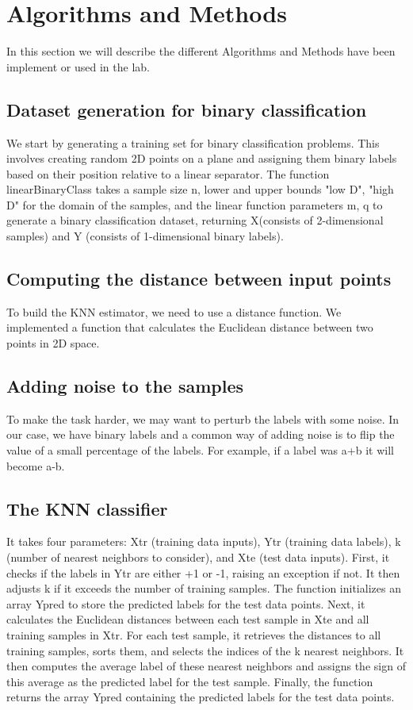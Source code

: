\documentclass[a4paper,10pt,oneside]{article}
\begin{document}
\section{ Algorithms and Methods }
\label{sec:format}
In this section we will describe the different Algorithms and Methods have been 
implement or used in the lab.

\subsection{ Dataset generation for binary classification }
\label{ssec:subhead}
We start by generating a training set for binary classification problems. 
This involves creating random 2D points on a plane and assigning them binary 
labels based on their position relative to a linear separator.
The function linearBinaryClass takes a sample size n, lower and upper bounds 
"low D", "high D" for the domain of the samples, and the linear function 
parameters m, q to generate a binary classification dataset, 
returning X(consists of 2-dimensional samples) and Y
(consists of 1-dimensional binary labels).

\subsection{ Computing the distance between input points }
\label{ssec:subhead}
To build the KNN estimator, we need to use a distance function. 
We implemented a function that calculates the Euclidean distance
between two points in 2D space.

\subsection{ Adding noise to the samples }
\label{ssec:subhead}
To make the task harder, we may want to perturb the labels with some noise.
In our case, we have binary labels and a common way of adding noise is to 
flip the value of a small percentage of the labels. 
For example, if a label was a+b it will become a-b.

\subsection{ The KNN classifier }
\label{ssec:subhead}
It takes four parameters: Xtr (training data inputs), Ytr (training data labels), k (number of nearest neighbors to consider), and Xte (test data inputs).
First, it checks if the labels in Ytr are either +1 or -1, raising an exception if not. It then adjusts k if it exceeds the number of training samples.
The function initializes an array Ypred to store the predicted labels for the test data points.
Next, it calculates the Euclidean distances between each test sample in Xte and all training samples in Xtr.
For each test sample, it retrieves the distances to all training samples, sorts them, and selects the indices of the k nearest neighbors. It then computes the average label of these nearest neighbors and assigns the sign of this average as the predicted label for the test sample.
Finally, the function returns the array Ypred containing the predicted labels for the test data points.
\end{document}
